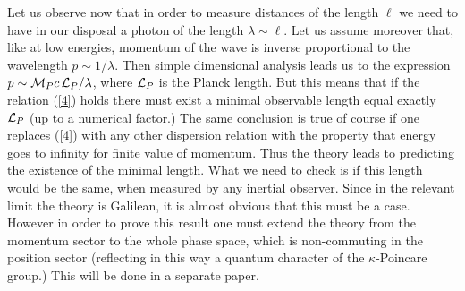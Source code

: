 \documentclass [11pt] {article}
\begin{document}
Let us observe   now that in order to measure distances of the length 
$\ell$ we need to have in our disposal a photon of the length $\lambda \sim 
\ell$.  Let us assume moreover that, like at low energies, momentum of the wave 
is inverse proportional to the wavelength $p \sim 1/\lambda$. Then simple 
dimensional analysis leads us to the  expression $p \sim {\cal M}_P c \, 
{\cal L}_P/\lambda$, where ${\cal L}_P$ is the Planck  length. But this 
means that if the relation (\ref{4}) holds there must exist a minimal 
observable length equal exactly ${\cal L}_P$ (up to a numerical factor.) 
The same conclusion is true of course if one replaces (\ref{4}) with any 
other dispersion relation with the property that energy goes to infinity 
for finite value of momentum. Thus the theory leads to predicting the 
existence of the minimal length. What we need to check is if this length 
would be the same, when measured by any inertial observer. Since in the 
relevant limit the theory is Galilean, it is almost obvious that this must 
be a case. However in order to prove this result one must extend the theory 
from the momentum sector to the whole phase space, which is non-commuting 
in the position sector (reflecting in this way a quantum character of the 
$\kappa$-Poincare group.) This will be done in a separate paper. 
\newline
\end{document}
